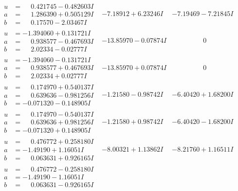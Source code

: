 \documentclass[1p]{elsarticle_modified}
\theoremstyle{definition}
\begin{document}
$$\begin{array}{c|c|c}
\begin{aligned}
u &= \phantom{-}0.421745 - 0.482603 I \\
a &= \phantom{-}1.286390 + 0.505129 I \\
b &= \phantom{-}0.17570 - 2.03467 I\end{aligned}
 & -7.18912 + 6.23246 I & -7.19469 - 7.21845 I \\ \hline\begin{aligned}
u &= -1.394060 + 0.131721 I \\
a &= \phantom{-}0.938577 - 0.467693 I \\
b &= \phantom{-}2.02334 - 0.02777 I\end{aligned}
 & -13.85970 - 0.07874 I & \phantom{-0.000000 } 0 \\ \hline\begin{aligned}
u &= -1.394060 - 0.131721 I \\
a &= \phantom{-}0.938577 + 0.467693 I \\
b &= \phantom{-}2.02334 + 0.02777 I\end{aligned}
 & -13.85970 + 0.07874 I & \phantom{-0.000000 } 0 \\ \hline\begin{aligned}
u &= \phantom{-}0.174970 + 0.540137 I \\
a &= \phantom{-}0.639636 - 0.981256 I \\
b &= -0.071320 - 0.148905 I\end{aligned}
 & -1.21580 - 0.98742 I & -6.40420 + 1.68200 I \\ \hline\begin{aligned}
u &= \phantom{-}0.174970 - 0.540137 I \\
a &= \phantom{-}0.639636 + 0.981256 I \\
b &= -0.071320 + 0.148905 I\end{aligned}
 & -1.21580 + 0.98742 I & -6.40420 - 1.68200 I \\ \hline\begin{aligned}
u &= \phantom{-}0.476772 + 0.258180 I \\
a &= -1.49190 + 1.16051 I \\
b &= \phantom{-}0.063631 + 0.926165 I\end{aligned}
 & -8.00321 + 1.13862 I & -8.21760 + 1.16511 I \\ \hline\begin{aligned}
u &= \phantom{-}0.476772 - 0.258180 I \\
a &= -1.49190 - 1.16051 I \\
b &= \phantom{-}0.063631 - 0.926165 I\end{aligned}

\end{array}$$
\end{document}
